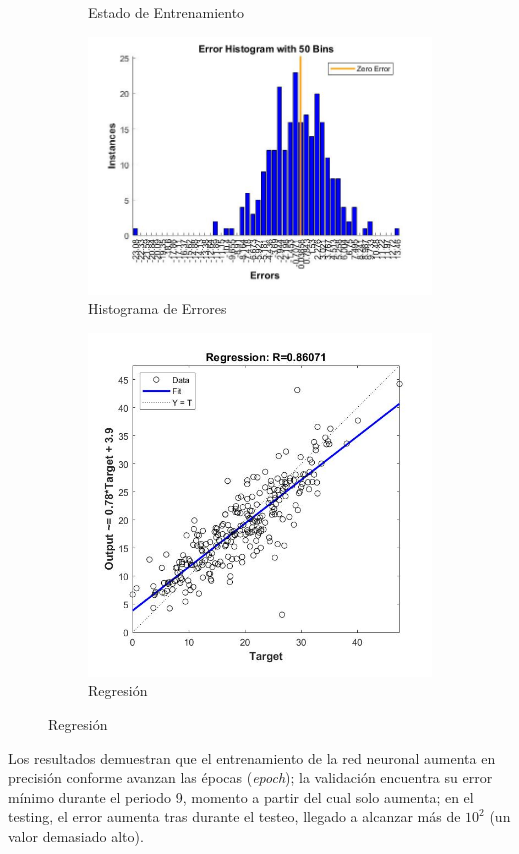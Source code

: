 \documentclass{article}
\begin{document}
\begin{figure}[H]
\begin{subfigure}{0.4\textwidth}
  \caption{Estado de Entrenamiento}
 \end{subfigure}
 \begin{subfigure}{0.4\textwidth}
  \includegraphics[width=0.8\linewidth]{../images/I_ex3_errorhistogram_bodyfat_dataset.jpg}
  \caption{Histograma de Errores}
 \end{subfigure}
 \begin{subfigure}{0.4\textwidth}
  \includegraphics[width=0.8\linewidth]{../images/I_ex3_regression_bodyfat_dataset.jpg}
  \caption{Regresión}
 \end{subfigure}
\end{figure}

Los resultados demuestran que el entrenamiento de la red neuronal aumenta en
precisión conforme avanzan las épocas (\textit{epoch}); la validación encuentra
su error mínimo durante el periodo 9, momento a partir del cual solo aumenta; en
el testing, el error aumenta tras durante el testeo, llegado a alcanzar más de 
$10^2$ (un valor demasiado alto).
\end{document}
